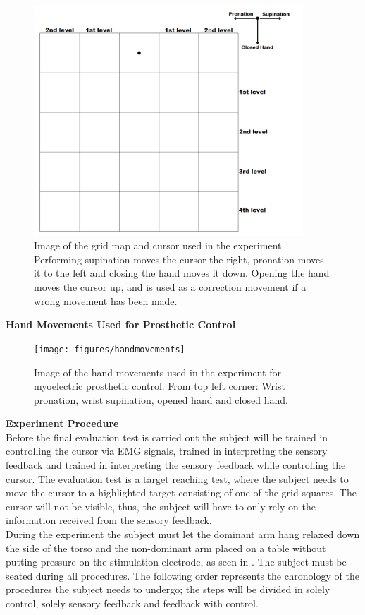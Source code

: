 \begin{figure}[H]                 
	\includegraphics[width=0.9\textwidth]{figures/gridmap2}  
	\caption{Image of the grid map and cursor used in the experiment. Performing supination moves the cursor the right, pronation moves it to the left and closing the hand moves it down. Opening the hand moves the cursor up, and is used as a correction movement if a wrong movement has been made.}
	\label{fig:gridmap} 
\end{figure}
\newpage

\textbf{{\Large Hand Movements Used for Prosthetic Control}} \\

\begin{figure}[H]                 
	\texttt{[image: figures/handmovements]}
	\caption{Image of the hand movements used in the experiment for myoelectric prosthetic control. From top left corner: Wrist pronation, wrist supination, opened hand and closed hand.}
	\label{fig:handmovements} 
\end{figure}

\textbf{{\Large Experiment Procedure}} \\
\newline
Before the final evaluation test is carried out the subject will be trained in controlling the cursor via EMG signals, trained in interpreting the sensory feedback and trained in interpreting the sensory feedback while controlling the cursor. The evaluation test is a target reaching test, where the subject needs to move the cursor to a highlighted target consisting of one of the grid squares. The cursor will not be visible, thus, the subject will have to only rely on the information received from the sensory feedback. \\
During the experiment the subject must let the dominant arm hang relaxed down the side of the torso and the non-dominant arm placed on a table without putting pressure on the stimulation electrode, as seen in . The subject must be seated during all procedures. The following order represents the chronology of the procedures the subject needs to undergo; the steps will be divided in solely control, solely sensory feedback and feedback with control. 


